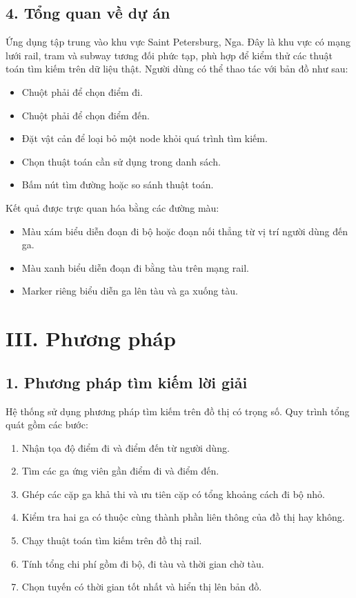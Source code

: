 \documentclass[12pt,a4paper]{article}
\begin{document}
\subsection*{4. Tổng quan về dự án}

Ứng dụng tập trung vào khu vực Saint Petersburg, Nga. Đây là khu vực có mạng lưới rail, tram và subway tương đối phức tạp, phù hợp để kiểm thử các thuật toán tìm kiếm trên dữ liệu thật. Người dùng có thể thao tác với bản đồ như sau:
\begin{itemize}
    \item Chuột phải để chọn điểm đi.
    \item Chuột phải để chọn điểm đến.
    \item Đặt vật cản để loại bỏ một node khỏi quá trình tìm kiếm.
    \item Chọn thuật toán cần sử dụng trong danh sách.
    \item Bấm nút tìm đường hoặc so sánh thuật toán.
\end{itemize}

Kết quả được trực quan hóa bằng các đường màu:
\begin{itemize}
    \item Màu xám biểu diễn đoạn đi bộ hoặc đoạn nối thẳng từ vị trí người dùng đến ga.
    \item Màu xanh biểu diễn đoạn đi bằng tàu trên mạng rail.
    \item Marker riêng biểu diễn ga lên tàu và ga xuống tàu.
\end{itemize}

\section*{III. Phương pháp}

\subsection*{1. Phương pháp tìm kiếm lời giải}

Hệ thống sử dụng phương pháp tìm kiếm trên đồ thị có trọng số. Quy trình tổng quát gồm các bước:
\begin{enumerate}
    \item Nhận tọa độ điểm đi và điểm đến từ người dùng.
    \item Tìm các ga ứng viên gần điểm đi và điểm đến.
    \item Ghép các cặp ga khả thi và ưu tiên cặp có tổng khoảng cách đi bộ nhỏ.
    \item Kiểm tra hai ga có thuộc cùng thành phần liên thông của đồ thị hay không.
    \item Chạy thuật toán tìm kiếm trên đồ thị rail.
    \item Tính tổng chi phí gồm đi bộ, đi tàu và thời gian chờ tàu.
    \item Chọn tuyến có thời gian tốt nhất và hiển thị lên bản đồ.
\end{enumerate}
\end{document}
